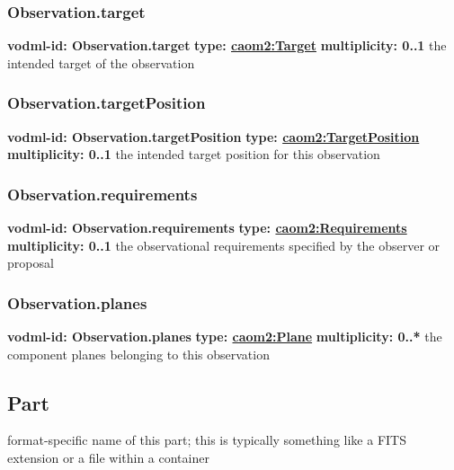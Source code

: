     \subsubsection{Observation.target}
      \textbf{vodml-id: Observation.target} \newline
      \textbf{type: \hyperref[sect:Target]{caom2:Target}} \newline
      \textbf{multiplicity: 0..1} \newline
      the intended target of the observation

    \subsubsection{Observation.targetPosition}
      \textbf{vodml-id: Observation.targetPosition} \newline
      \textbf{type: \hyperref[sect:TargetPosition]{caom2:TargetPosition}} \newline
      \textbf{multiplicity: 0..1} \newline
      the intended target position for this observation

    \subsubsection{Observation.requirements}
      \textbf{vodml-id: Observation.requirements} \newline
      \textbf{type: \hyperref[sect:Requirements]{caom2:Requirements}} \newline
      \textbf{multiplicity: 0..1} \newline
      the observational requirements specified by the observer or proposal

    \subsubsection{Observation.planes}
      \textbf{vodml-id: Observation.planes} \newline
      \textbf{type: \hyperref[sect:Plane]{caom2:Plane}} \newline
      \textbf{multiplicity: 0..*} \newline
      the component planes belonging to this observation

  \subsection{Part}
  \label{sect:Part}
    format-specific name of this part; this is typically something like a FITS extension or a file within a container


